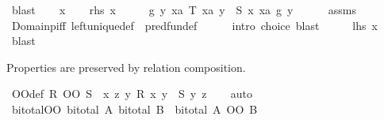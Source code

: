 \begin{isabellebody}
\ blast\isanewline
{}\isamarkupfalse%
\isanewline
\ \ \isamarkupfalse%
\ x\isanewline
\ \ \isamarkupfalse%
\ {\isachardoublequoteopen}{\isacharquery}{\kern0pt}rhs\ x{\isachardoublequoteclose}\isanewline
\ \ \isamarkupfalse%
\ \isamarkupfalse%
\ {\isachardoublequoteopen}{\isasymexists}g{\isachardot}{\kern0pt}\ {\isasymforall}y\ xa{\isachardot}{\kern0pt}\ T\ xa\ y\ {\isasymlongrightarrow}\ S\ {\isacharparenleft}{\kern0pt}x\ xa{\isacharparenright}{\kern0pt}\ {\isacharparenleft}{\kern0pt}g\ y{\isacharparenright}{\kern0pt}{\isachardoublequoteclose}\isanewline
\ \ \ \ \isamarkupfalse%
\ assms\ \isamarkupfalse%
\ Domainp{\isacharunderscore}{\kern0pt}iff\ left{\isacharunderscore}{\kern0pt}unique{\isacharunderscore}{\kern0pt}def\ \ pred{\isacharunderscore}{\kern0pt}fun{\isacharunderscore}{\kern0pt}def\isanewline
\ \ \ \ \isamarkupfalse%
\ {\isacharparenleft}{\kern0pt}intro\ choice{\isacharparenright}{\kern0pt}\ blast\isanewline
\ \ \isamarkupfalse%
\ \isamarkupfalse%
\ {\isachardoublequoteopen}{\isacharquery}{\kern0pt}lhs\ x{\isachardoublequoteclose}\isanewline
\ \ \ \ \isamarkupfalse%
\ blast\isanewline
{}\isamarkupfalse%
%
\endisatagproof
{\isafoldproof}%
%
\isadelimproof
%
\endisadelimproof
%
\begin{isamarkuptext}%
Properties are preserved by relation composition.%
\end{isamarkuptext}\isamarkuptrue%
\isamarkupfalse%
\ OO{\isacharunderscore}{\kern0pt}def{\isacharcolon}{\kern0pt}\ {\isachardoublequoteopen}R\ OO\ S\ {\isacharequal}{\kern0pt}\ {\isacharparenleft}{\kern0pt}{\isasymlambda}x\ z{\isachardot}{\kern0pt}\ {\isasymexists}y{\isachardot}{\kern0pt}\ R\ x\ y\ {\isasymand}\ S\ y\ z{\isacharparenright}{\kern0pt}{\isachardoublequoteclose}\isanewline
%
\isadelimproof
\ \ %
\endisadelimproof
%
\isatagproof
{}\isamarkupfalse%
\ auto%
\endisatagproof
{\isafoldproof}%
%
\isadelimproof
\isanewline
%
\endisadelimproof
\isanewline
{}\isamarkupfalse%
\ bi{\isacharunderscore}{\kern0pt}total{\isacharunderscore}{\kern0pt}OO{\isacharcolon}{\kern0pt}\ {\isachardoublequoteopen}{\isasymlbrakk}bi{\isacharunderscore}{\kern0pt}total\ A{\isacharsemicolon}{\kern0pt}\ bi{\isacharunderscore}{\kern0pt}total\ B{\isasymrbrakk}\ {\isasymLongrightarrow}\ bi{\isacharunderscore}{\kern0pt}total\ {\isacharparenleft}{\kern0pt}A\ OO\ B{\isacharparenright}{\kern0pt}{\isachardoublequoteclose}\isanewline

\end{isabellebody}
